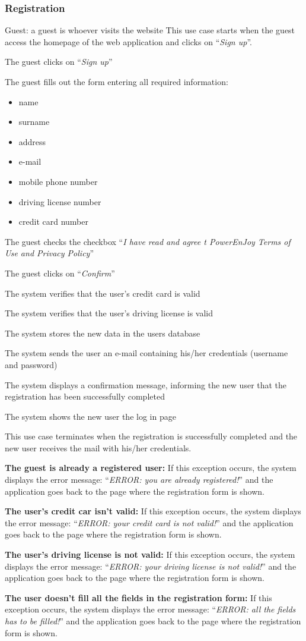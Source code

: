 \newcommand{\Event}[1]{
	\item #1
}

\newcommand{\Exc}[2]{
	\item \textbf{#1:} #2
	
}


\subsubsection{Registration}
\toggletrue{exception}
\begin{UseCase}
	{Guest: a guest is whoever visits the website}
	{This use case starts when the guest access the homepage of the web application and clicks on ``\textit{Sign up}''.}
	{
		\Event{The guest clicks on ``\textit{Sign up}''}
		\Event{The guest fills out the form entering all required information:
			\begin{itemize}
				\item name
				\item surname
				\item address
				\item e-mail
				\item mobile phone number
				\item driving license number
				\item credit card number
		\end{itemize}}
		\Event{The guest checks the checkbox ``\textit{I have read and agree t PowerEnJoy Terms of Use and Privacy Policy}''}
		\Event{The guest clicks on ``\textit{Confirm}''}
		\Event{The system verifies that the user's credit card is valid}
		\Event{The system verifies that the user's driving license is valid}
		\Event{The system stores the new data in the users database}
		\Event{The system sends the user an e-mail containing his/her credentials (username and password)}
		\Event{The system displays a confirmation message, informing the new user that the registration has been successfully completed}
		\Event{The system shows the new user the log in page}
	}
	{This use case terminates when the registration is successfully completed and the new user receives the mail with his/her credentials.}
	{
		\Exc{The guest is already a registered user}{If this exception occurs, the system displays the error message: ``\textit{ERROR: you are already registered!}'' and the application goes back to the page where the registration form is shown.}
		\Exc{The user's credit car isn't valid}{If this exception occurs, the system displays the error message: ``\textit{ERROR: your credit card is not valid!}'' and the application goes back to the page where the registration form is shown.}
		\Exc{The user's driving license is not valid}{If this exception occurs, the system displays the error message: ``\textit{ERROR: your driving license is not valid!}'' and the application goes back to the page where the registration form is shown.}
		\Exc{The user doesn't fill all the fields in the registration form}{If this exception occurs, the system displays the error message: ``\textit{ERROR: all the fields has to be filled!}'' and the application goes back to the page where the registration form is shown.}
	}
\end{UseCase}


